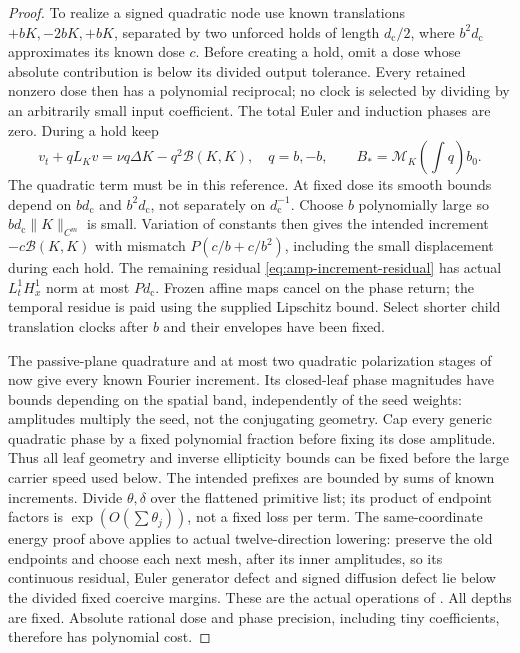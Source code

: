 \documentclass[11pt,a4paper]{amsart}
\theoremstyle{definition}
\theoremstyle{remark}
\numberwithin{equation}{section}
\newcommand{\Bcal}{\mathcal B}
\newcommand{\Mcal}{\mathcal M}
\newcommand{\norm}[1]{\lVert #1\rVert}
\begin{document}
\begin{proof}
To realize a signed quadratic node use known translations
$+bK,-2bK,+bK$, separated by two unforced holds of length $d_{\mathrm c}/2$,
where $b^2d_{\mathrm c}$ approximates its known dose $c$.
Before creating a hold, omit a dose whose absolute contribution is below
its divided output tolerance.  Every retained nonzero dose then has a
polynomial reciprocal; no clock is selected by dividing by an arbitrarily
small input coefficient.
The total Euler and induction phases are zero.  During a hold keep
\[
 v_t+qL_Kv=\nu q\Delta K-q^2\Bcal(K,K),\quad q=b,-b,
 \qquad B_*=\Mcal_K\left(\int q\right)b_0 .
 \]
The quadratic term must be in this reference.  At fixed dose its
smooth bounds depend on $b d_{\mathrm c}$ and $b^2d_{\mathrm c}$, not separately on $d_{\mathrm c}^{-1}$.
Choose $b$ polynomially large so $b d_{\mathrm c}\norm K_{C^m}$ is small.
Variation of constants then gives the intended increment
$-c\Bcal(K,K)$ with mismatch
$P(c/b+c/b^2)$, including the small displacement during each hold.
The remaining residual \eqref{eq:amp-increment-residual} has actual
$L^1_tH^1_x$ norm at most $Pd_{\mathrm c}$.
Frozen affine maps cancel on the phase return; the temporal residue
is paid using the supplied Lipschitz bound.
Select shorter child translation clocks after $b$ and their envelopes
have been fixed.

The passive-plane quadrature and at most two quadratic polarization
stages of \cite[Sections~8.3--8.4]{Common} now give every known
Fourier increment. Its closed-leaf phase magnitudes have bounds
depending on the spatial band, independently of the seed weights:
amplitudes multiply the seed, not the conjugating geometry.
Cap every generic quadratic phase by a fixed polynomial fraction
before fixing its dose amplitude. Thus all leaf geometry and inverse
ellipticity bounds can be fixed before the large carrier speed used below.
The intended prefixes are bounded by sums of
known increments.  Divide $\theta,\delta$ over the flattened
primitive list; its product of endpoint factors is
$\exp(O(\sum\theta_j))$, not a fixed loss per term.
The same-coordinate energy proof above applies to actual
twelve-direction lowering: preserve the old endpoints and choose
each next mesh, after its inner amplitudes, so its continuous
residual, Euler generator defect and signed diffusion defect lie
below the divided fixed coercive margins.  These are the actual
operations of \cite[Section~8.6]{Common}.
All depths are fixed.  Absolute rational dose and phase precision,
including tiny coefficients, therefore has polynomial cost.
\end{proof}
\end{document}
